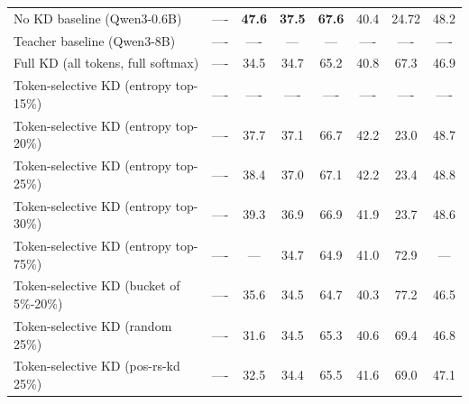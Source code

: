 \documentclass[11pt]{article}
\begin{document}
\begin{table}[t]
{\begin{tabular}{lccccccc}
		\midrule
		No KD baseline (Qwen3-0.6B)      		   & ----    & \textbf{47.6} 	      & \textbf{37.5}             & \textbf{67.6} 	      	& 40.4                        & 24.72                   & 48.2          \\
		Teacher baseline (Qwen3-8B)      		   & ----    & ----                   & ---                       & ---                 	& ----                        & ----                    & ----          \\
		\midrule
		Full KD (all tokens, full softmax)         & ----    & 34.5                  & 34.7                      & 65.2                 & 40.8                        & 67.3                    & 46.9          \\
		Token-selective KD (entropy top-15\%)      & ----    & ----                  & ----                      & ----                 & ----                        & ----                    & ----          \\
		Token-selective KD (entropy top-20\%)      & ----    & 37.7                  & 37.1                      & 66.7                 & 42.2                        & 23.0                    & 48.7          \\
		Token-selective KD (entropy top-25\%)      & ----    & 38.4                  & 37.0                      & 67.1                 & 42.2                        & 23.4                    & 48.8          \\
		Token-selective KD (entropy top-30\%)      & ----    & 39.3                  & 36.9                      & 66.9                 & 41.9                        & 23.7                    & 48.6          \\
		Token-selective KD (entropy top-75\%)      & ----    & ---                   & 34.7                      & 64.9                 & 41.0                        & 72.9                    & ---           \\
		Token-selective KD (bucket of 5\%-20\%)    & ----    & 35.6                  & 34.5                      & 64.7                 & 40.3                        & 77.2                    & 46.5          \\
		Token-selective KD (random 25\%)           & ----    & 31.6                  & 34.5                      & 65.3                 & 40.6                        & 69.4                    & 46.8          \\
		Token-selective KD (pos-rs-kd 25\%)        & ----    & 32.5                  & 34.4                      & 65.5                 & 41.6                        & 69.0                    & 47.1          \\

\end{tabular}}
\end{table}
\end{document}
